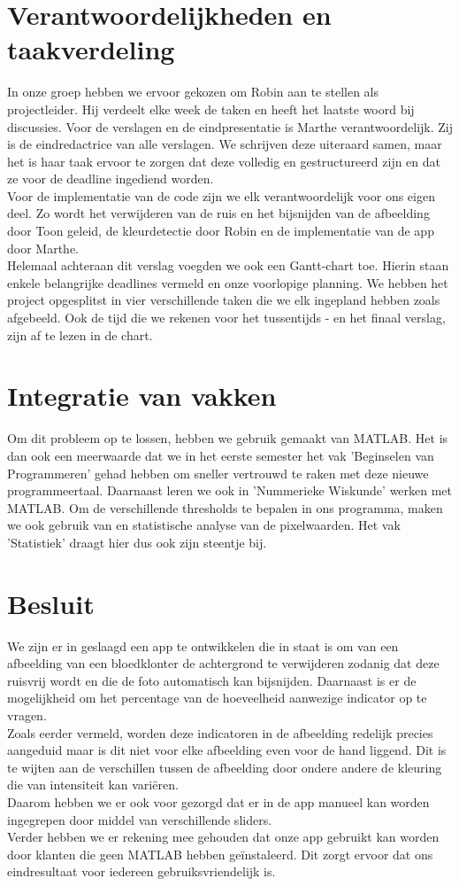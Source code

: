 \documentclass[a4paper,kulak]{kulakarticle}
\begin{document}
\section{Verantwoordelijkheden en taakverdeling}		
In onze groep hebben we ervoor gekozen om Robin aan te stellen als projectleider. Hij verdeelt elke week de taken en heeft het laatste woord bij discussies. 
Voor de verslagen en de eindpresentatie is Marthe verantwoordelijk. Zij is de eindredactrice van alle verslagen. We schrijven deze uiteraard samen, maar het is haar taak ervoor te zorgen dat deze volledig en gestructureerd zijn en dat ze voor de deadline ingediend worden.\\
Voor de implementatie van de code zijn we elk verantwoordelijk voor ons eigen deel. Zo wordt het verwijderen van de ruis en het bijsnijden van de afbeelding door Toon geleid, de kleurdetectie door Robin en de implementatie van de app door Marthe.\\
Helemaal achteraan dit verslag voegden we ook een Gantt-chart toe. Hierin staan enkele belangrijke deadlines vermeld en onze voorlopige planning. We hebben het project opgesplitst in vier verschillende taken die we elk ingepland hebben zoals afgebeeld. Ook de tijd die we rekenen voor het tussentijds - en het finaal verslag, zijn af te lezen in de chart.

\section{Integratie van vakken}
Om dit probleem op te lossen, hebben we gebruik gemaakt van MATLAB. Het is dan ook een meerwaarde dat we in het eerste semester het vak 'Beginselen van Programmeren' gehad hebben om sneller vertrouwd te raken met deze nieuwe programmeertaal. Daarnaast leren we ook in 'Nummerieke Wiskunde' werken met MATLAB. Om de verschillende thresholds te bepalen in ons programma, maken we ook gebruik van en statistische analyse van de pixelwaarden. Het vak 'Statistiek' draagt hier dus ook zijn steentje bij.

\section{Besluit}	
We zijn er in geslaagd een app te ontwikkelen die in staat is om van een afbeelding van een bloedklonter de achtergrond te verwijderen zodanig dat deze ruisvrij wordt en die de foto automatisch kan bijsnijden. Daarnaast is er de mogelijkheid om het percentage van de hoeveelheid aanwezige indicator op te vragen.\\ 
Zoals eerder vermeld, worden deze indicatoren in de afbeelding redelijk precies aangeduid maar is dit niet voor elke afbeelding even voor de hand liggend. Dit is te wijten aan de verschillen tussen de afbeelding door ondere andere de kleuring die van intensiteit kan variëren. \\
Daarom hebben we er ook voor gezorgd dat er in de app manueel kan worden ingegrepen door middel van verschillende sliders. \\ 
Verder hebben we er rekening mee gehouden dat onze app gebruikt kan worden door klanten die geen MATLAB hebben geïnstaleerd. Dit zorgt ervoor dat ons eindresultaat voor iedereen gebruiksvriendelijk is.


\newpage




\end{document}
